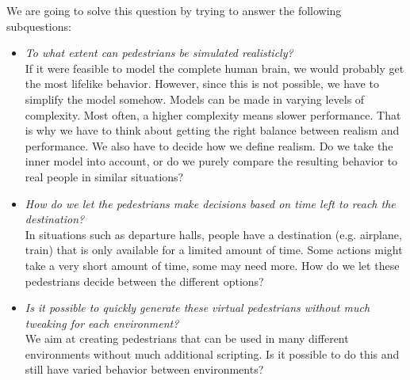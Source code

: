 \documentclass[11pt]{book}
\begin{document}
We are going to solve this question by trying to answer the following subquestions:
\begin{itemize}
\item \emph{To what extent can pedestrians be simulated realisticly?}\\
If it were feasible to model the complete human brain, we would probably get the most lifelike behavior. However, since this is not possible, we have to simplify the model somehow. Models can be made in varying levels of complexity. Most often, a higher complexity means slower performance. That is why we have to think about getting the right balance between realism and performance. We also have to decide how we define realism. Do we take the inner model into account, or do we purely compare the resulting behavior to real people in similar situations?

\item \emph{How do we let the pedestrians make decisions based on time left to reach the destination?}\\
In situations such as departure halls, people have a destination (e.g. airplane, train) that is only available for a limited amount of time. Some actions might take a very short amount of time, some may need more. How do we let these pedestrians decide between the different options?


\item \emph{Is it possible to quickly generate these virtual pedestrians without much tweaking for each environment?}\\
We aim at creating pedestrians that can be used in many different environments without much additional scripting. Is it possible to do this and still have varied behavior between environments?
\end{itemize}
\end{document}
